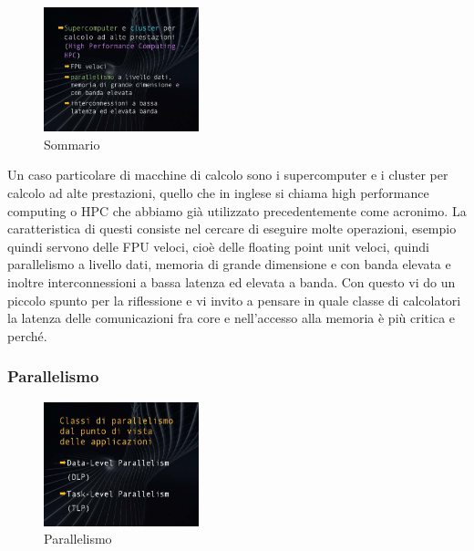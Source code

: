 \FloatBarrier
\begin{figure}[H]
  \centering
  \includegraphics[width=0.40\textwidth,
                    trim=40 80 10 40, %
                    clip]
                    {images/Lez03_p01_fig_06.png}
  \caption{Sommario}
  \label{fig:Lez03_p01_fig_06}
\end{figure}
\FloatBarrier
\noindent
Un caso particolare di macchine di calcolo sono i supercomputer e i cluster per calcolo ad alte prestazioni, quello che in inglese si chiama high performance computing o HPC che abbiamo già utilizzato precedentemente come acronimo.
La caratteristica di questi consiste nel cercare di eseguire molte operazioni, esempio quindi servono delle FPU  veloci, cioè delle floating point unit veloci, quindi parallelismo a livello dati, memoria di grande dimensione e con banda elevata e inoltre interconnessioni a bassa latenza ed elevata a banda.
Con questo vi do un piccolo spunto per la riflessione e vi invito a pensare in quale classe di calcolatori la latenza delle comunicazioni fra core e nell'accesso alla memoria è più critica e perché.

\subsubsection{Parallelismo}

\FloatBarrier
\begin{figure}[H]
  \centering
  \includegraphics[width=0.40\textwidth,
                    trim=40 80 10 40, %
                    clip]
                    {images/Lez03_p02_fig_03.png}
  \caption{Parallelismo}
  \label{fig:Lez03_p02_fig_03}
\end{figure}
\FloatBarrier
\noindent

